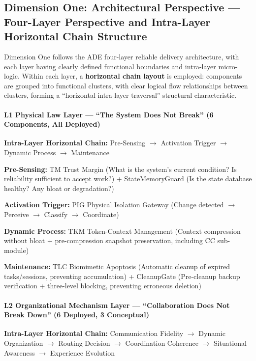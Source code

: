 \documentclass[11pt,a4paper]{article}
\begin{document}
\subsection{Dimension One: Architectural Perspective --- Four-Layer Perspective and Intra-Layer Horizontal Chain Structure}
\label{sec:9.2}

Dimension One follows the ADE four-layer reliable delivery architecture, with each layer having clearly defined functional boundaries and intra-layer micro-logic. Within each layer, a \textbf{horizontal chain layout} is employed: components are grouped into functional clusters, with clear logical flow relationships between clusters, forming a ``horizontal intra-layer traversal'' structural characteristic.

\paragraph{L1 Physical Law Layer --- ``The System Does Not Break'' (6 Components, All Deployed)}
\textbf{Intra-Layer Horizontal Chain:} Pre-Sensing $\rightarrow$ Activation Trigger $\rightarrow$ Dynamic Process $\rightarrow$ Maintenance

\textbf{Pre-Sensing:} TM Trust Margin (What is the system's current condition? Is reliability sufficient to accept work?) + StateMemoryGuard (Is the state database healthy? Any bloat or degradation?)

\textbf{Activation Trigger:} PIG Physical Isolation Gateway (Change detected $\rightarrow$ Perceive $\rightarrow$ Classify $\rightarrow$ Coordinate)

\textbf{Dynamic Process:} TKM Token-Context Management (Context compression without bloat + pre-compression snapshot preservation, including CC sub-module)

\textbf{Maintenance:} TLC Biomimetic Apoptosis (Automatic cleanup of expired tasks/sessions, preventing accumulation) + CleanupGate (Pre-cleanup backup verification + three-level blocking, preventing erroneous deletion)

\paragraph{L2 Organizational Mechanism Layer --- ``Collaboration Does Not Break Down'' (6 Deployed, 3 Conceptual)}
\textbf{Intra-Layer Horizontal Chain:} Communication Fidelity $\rightarrow$ Dynamic Organization $\rightarrow$ Routing Decision $\rightarrow$ Coordination Coherence $\rightarrow$ Situational Awareness $\rightarrow$ Experience Evolution
\end{document}
